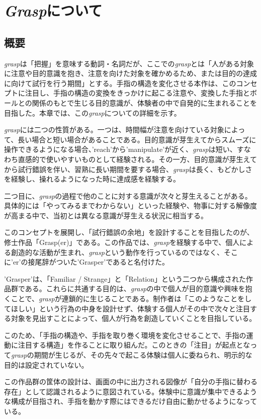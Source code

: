 \chapter{\textit{Grasp}について}
\label{define_model}

\section{概要}
\textit{grasp}は「把握」を意味する動詞・名詞だが、ここでの\textit{grasp}とは「人がある対象に注意や目的意識を抱き、注意を向けた対象を確かめるため、または目的の達成に向けて試行を行う期間」とする。手指の構造を変化させる本作は、このコンセプトに注目し、手指の構造の変換をきっかけに起こる注意や、変換した手指とボールとの関係のもとで生じる目的意識が、体験者の中で自発的に生まれることを目指した。本章では、この\textit{grasp}についての詳細を示す。

\textit{grasp}には二つの性質がある。一つは、時間幅が注意を向けている対象によって、長い場合と短い場合があることである。目的意識が芽生えてからスムーズに操作できるようになる場合、'reach'から'manipulate'が近く、\textit{grasp}は短い、すなわち直感的で使いやすいものとして経験される。その一方、目的意識が芽生えてから試行錯誤を伴い、習熟に長い期間を要する場合、\textit{grasp}は長く、もどかしさを経験し、操れるようになった時に達成感を経験する。

二つ目に、\textit{grasp}の過程で他のことに対する意識が次々と芽生えることがある。具体的には「やってみるまでわからない」といった経験や、物事に対する解像度が高まる中で、当初とは異なる意識が芽生える状況に相当する。

このコンセプトを展開し、「試行錯誤の余地」を設計することを目指したのが、修士作品「Grasp(er)」である。この作品では、\textit{grasp}を経験する中で、個人による創造的な活動が生まれ、\textit{grasp}という動作を行っているのではなく、そこに'er'の接尾辞がついた'Grasper'であると名付けた。

'Grasper'は、「Familiar / Strange」と「Relation」という二つから構成された作品群である。これらに共通する目的は、\textit{grasp}の中で個人が目的意識や興味を抱くことで、\textit{grasp}が連鎖的に生じることである。制作者は「このようなことをしてほしい」という行為の中身を設計せず、体験する個人がその中で次々と注目する対象を見出すことによって、個人が行為を創造していくことを目指している。

このため、「手指の構造や、手指を取り巻く環境を変化させることで、手指の運動に注目する構造」を作ることに取り組んだ。このときの「注目」が起点となって\textit{grasp}の期間が生じるが、その先々で起こる体験は個人に委ねられ、明示的な目的は設定されていない。

この作品群の筐体の設計は、画面の中に出力される図像が「自分の手指に替わる存在」として認識されるように意図されている。体験中に意識が集中できるような構成が目指され、手指を動かす際にはできるだけ自由に動かせるようになっている。
